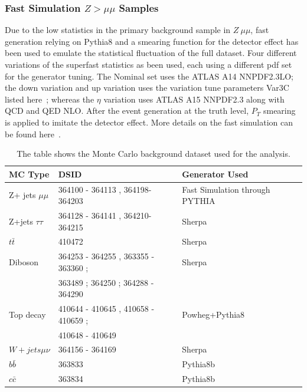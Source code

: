 \subsubsection{Fast Simulation $Z > \mu\mu$  Samples}
\label{sec:fastsimulation}
Due to the low statistics in the primary background sample in  $Z \> \mu \mu$, fast generation relying on Pythia8 and a smearing function for the detector effect has been used to emulate the statistical fluctuation of the full dataset. Four different variations of the superfast statistics as been used, each using a different pdf set for the generator tuning. The Nominal set uses the ATLAS A14 NNPDF2.3LO; the down variation and up variation uses the variation tune parameters Var3C listed
here~\cite{ATL-PHYS-PUB-2014-021}; whereas the $\eta$ variation uses ATLAS A15 NNPDF2.3 along with QCD and QED NLO. After the event generation at the truth level, $P_{T}$ smearing is applied to imitate the detector effect. More details on the fast simulation can be found here~\cite{Artoni:2703492}.

\begin{table}[!htb]
    \begin{center}
    \caption{
        The table shows the Monte Carlo background dataset used for the analysis. 
    \label{table:MC}
    }
\label{tab:MC samples}
\begin{tabular}{|l|l|l|}
\hline
\textbf{MC Type}   & \textbf{DSID}                                                         &\textbf{Generator Used}\\ \hline
Z+ jets $\mu\mu$   & 364100 - 364113 , 364198-364203                                       &Fast Simulation through PYTHIA\\ \hline
Z+jets $\tau \tau$ & 364128 - 364141 , 364210-364215                                       &Sherpa\\ \hline
$t\bar{t}$         & 410472                                                                &Sherpa\\ \hline
Diboson            & 364253 - 364255 , 363355 - 363360 ; &Sherpa \\
& 363489 ; 364250 ; 364288 - 364290 & \\ \hline
Top decay          & 410644 - 410645 , 410658 - 410659 ;                   &Powheg+Pythia8\\ 
&410648 - 410649 & \\ \hline
$W + jets \mu\nu$  & 364156 - 364169                                                       &Sherpa\\ \hline
$b\bar{b}$         & 363833                                                                &Pythia8b\\ \hline
$c\bar{c}$         & 363834                                                                &Pythia8b\\ \hline
\end{tabular}
\end{center}
\end{table}

